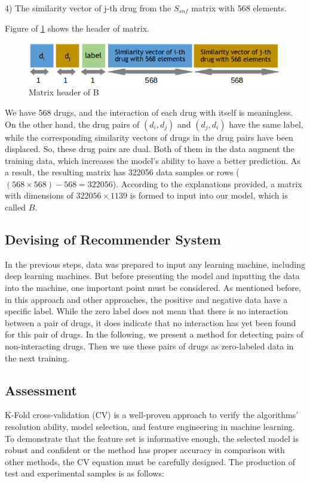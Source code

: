 \documentclass{bmcart}
\begin{document}
4) The similarity vector of j-th drug from the $S_{snf}$ matrix with 568 elements.

Figure of \ref{BMatHeader} shows the header of matrix.

\begin{figure}[!h]
	\centering
	\includegraphics[scale=.53]{MatrixheaderB.png}
	\caption{Matrix header of B}
	\label{BMatHeader}
\end{figure}

We have 568 drugs, and the interaction of each drug with itself is meaningless. On the other hand, the drug pairs of $(d_i, d_j)$ and $(d_j, d_i)$ have the same label, while the corresponding similarity vectors of drugs in the drug pairs have been displaced. So, these drug pairs are dual. Both of them in the data augment the training data, which increases the model's ability to have a better prediction. As a result, the resulting matrix has 322056 data samples or rows ($(568 \times 568) - 568 = 322056$). According to the explanations provided, a matrix with dimensions of $322056 \times 1139$ is formed to input into our model, which is called $B$.


\subsection*{Devising of Recommender System}
In the previous steps, data was prepared to input any learning machine, including deep learning machines. But before presenting the model and inputting the data into the machine, one important point must be considered. As mentioned before, in this approach and other approaches, the positive and negative data have a specific label. While the zero label does not mean that there is no interaction between a pair of drugs, it does indicate that no interaction has yet been found for this pair of drugs. In the following, we present a method for detecting pairs of non-interacting drugs. Then we use these pairs of drugs as zero-labeled data in the next training.

\subsection*{Assessment
\label{K_foldCV}}
K-Fold cross-validation (CV) is a well-proven approach to verify the algorithms' resolution ability, model selection, and feature engineering in machine learning. To demonstrate that the feature set is informative enough, the selected model is robust and confident or the method has proper accuracy in comparison with other methods, the CV equation must be carefully designed. The production of test and experimental samples is as follows:
\end{document}
